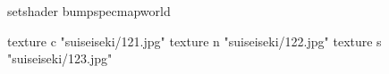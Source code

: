 setshader bumpspecmapworld

    texture c "suiseiseki/121.jpg"
    texture n "suiseiseki/122.jpg"
    texture s "suiseiseki/123.jpg"
